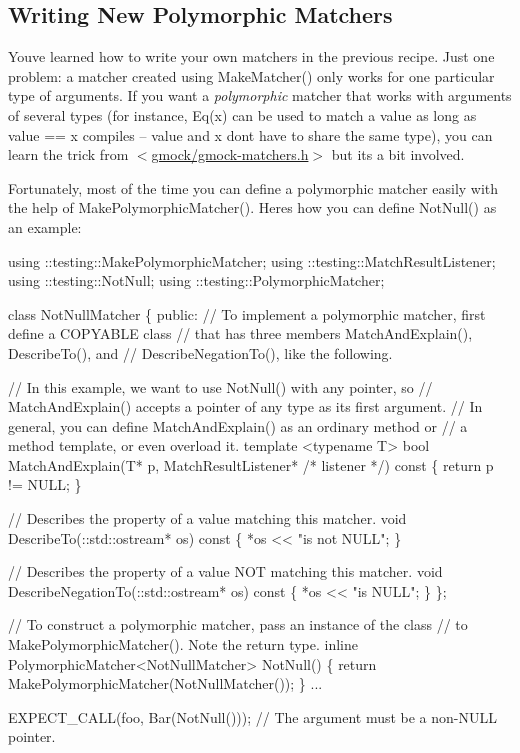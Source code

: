 \subsection*{Writing New Polymorphic Matchers}

You\textquotesingle{}ve learned how to write your own matchers in the previous recipe. Just one problem\+: a matcher created using {\ttfamily Make\+Matcher()} only works for one particular type of arguments. If you want a {\itshape polymorphic} matcher that works with arguments of several types (for instance, {\ttfamily Eq(x)} can be used to match a {\ttfamily value} as long as {\ttfamily value} == {\ttfamily x} compiles -- {\ttfamily value} and {\ttfamily x} don\textquotesingle{}t have to share the same type), you can learn the trick from {\ttfamily $<$\hyperlink{gmock-matchers_8h_source}{gmock/gmock-\/matchers.\+h}$>$} but it\textquotesingle{}s a bit involved.

Fortunately, most of the time you can define a polymorphic matcher easily with the help of {\ttfamily Make\+Polymorphic\+Matcher()}. Here\textquotesingle{}s how you can define {\ttfamily Not\+Null()} as an example\+:


\begin{DoxyCode}
using ::testing::MakePolymorphicMatcher;
using ::testing::MatchResultListener;
using ::testing::NotNull;
using ::testing::PolymorphicMatcher;

class NotNullMatcher \{
 public:
  // To implement a polymorphic matcher, first define a COPYABLE class
  // that has three members MatchAndExplain(), DescribeTo(), and
  // DescribeNegationTo(), like the following.

  // In this example, we want to use NotNull() with any pointer, so
  // MatchAndExplain() accepts a pointer of any type as its first argument.
  // In general, you can define MatchAndExplain() as an ordinary method or
  // a method template, or even overload it.
  template <typename T>
  bool MatchAndExplain(T* p,
                       MatchResultListener* /* listener */) const \{
    return p != NULL;
  \}

  // Describes the property of a value matching this matcher.
  void DescribeTo(::std::ostream* os) const \{ *os << "is not NULL"; \}

  // Describes the property of a value NOT matching this matcher.
  void DescribeNegationTo(::std::ostream* os) const \{ *os << "is NULL"; \}
\};

// To construct a polymorphic matcher, pass an instance of the class
// to MakePolymorphicMatcher().  Note the return type.
inline PolymorphicMatcher<NotNullMatcher> NotNull() \{
  return MakePolymorphicMatcher(NotNullMatcher());
\}
...

  EXPECT\_CALL(foo, Bar(NotNull()));  // The argument must be a non-NULL pointer.
\end{DoxyCode}



